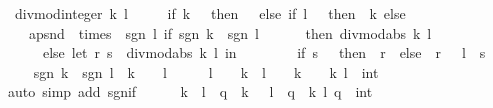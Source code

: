 \begin{isabellebody}
\ \ {\isachardoublequoteopen}divmod{\isacharunderscore}{\kern0pt}integer\ k\ l\ {\isacharequal}{\kern0pt}\isanewline
\ \ \ \ {\isacharparenleft}{\kern0pt}if\ k\ {\isacharequal}{\kern0pt}\ {}\ then\ {\isacharparenleft}{\kern0pt}{}{\isacharcomma}{\kern0pt}\ {}{\isacharparenright}{\kern0pt}\ else\ if\ l\ {\isacharequal}{\kern0pt}\ {}\ then\ {\isacharparenleft}{\kern0pt}{}{\isacharcomma}{\kern0pt}\ k{\isacharparenright}{\kern0pt}\ else\isanewline
\ \ \ \ {\isacharparenleft}{\kern0pt}apsnd\ {\isasymcirc}\ times\ {\isasymcirc}\ sgn{\isacharparenright}{\kern0pt}\ l\ {\isacharparenleft}{\kern0pt}if\ sgn\ k\ {\isacharequal}{\kern0pt}\ sgn\ l\isanewline
\ \ \ \ \ \ then\ divmod{\isacharunderscore}{\kern0pt}abs\ k\ l\isanewline
\ \ \ \ \ \ else\ {\isacharparenleft}{\kern0pt}let\ {\isacharparenleft}{\kern0pt}r{\isacharcomma}{\kern0pt}\ s{\isacharparenright}{\kern0pt}\ {\isacharequal}{\kern0pt}\ divmod{\isacharunderscore}{\kern0pt}abs\ k\ l\ in\isanewline
\ \ \ \ \ \ \ \ if\ s\ {\isacharequal}{\kern0pt}\ {}\ then\ {\isacharparenleft}{\kern0pt}{\isacharminus}{\kern0pt}\ r{\isacharcomma}{\kern0pt}\ {}{\isacharparenright}{\kern0pt}\ else\ {\isacharparenleft}{\kern0pt}{\isacharminus}{\kern0pt}\ r\ {\isacharminus}{\kern0pt}\ {}{\isacharcomma}{\kern0pt}\ {\isasymbar}l{\isasymbar}\ {\isacharminus}{\kern0pt}\ s{\isacharparenright}{\kern0pt}{\isacharparenright}{\kern0pt}{\isacharparenright}{\kern0pt}{\isacharparenright}{\kern0pt}{\isachardoublequoteclose}\isanewline
%
\isadelimproof
%
\endisadelimproof
%
\isatagproof
{}\isamarkupfalse%
\ {\isacharminus}{\kern0pt}\isanewline
\ \ \isamarkupfalse%
\ {\isacharasterisk}{\kern0pt}{\isacharcolon}{\kern0pt}\ {\isachardoublequoteopen}sgn\ k\ {\isacharequal}{\kern0pt}\ sgn\ l\ {\isasymlongleftrightarrow}\ k\ {\isacharequal}{\kern0pt}\ {}\ {\isasymand}\ l\ {\isacharequal}{\kern0pt}\ {}\ {\isasymor}\ {}\ {\isacharless}{\kern0pt}\ l\ {\isasymand}\ {}\ {\isacharless}{\kern0pt}\ k\ {\isasymor}\ l\ {\isacharless}{\kern0pt}\ {}\ {\isasymand}\ k\ {\isacharless}{\kern0pt}\ {}{\isachardoublequoteclose}\ \ k\ l\ {\isacharcolon}{\kern0pt}{\isacharcolon}{\kern0pt}\ int\isanewline
\ \ \ \ \isamarkupfalse%
\ {\isacharparenleft}{\kern0pt}auto\ simp\ add{\isacharcolon}{\kern0pt}\ sgn{\isacharunderscore}{\kern0pt}if{\isacharparenright}{\kern0pt}\isanewline
\ \ \isamarkupfalse%
\ {\isacharasterisk}{\kern0pt}{\isacharasterisk}{\kern0pt}{\isacharcolon}{\kern0pt}\ {\isachardoublequoteopen}{\isacharminus}{\kern0pt}\ k\ {\isacharequal}{\kern0pt}\ l\ {\isacharasterisk}{\kern0pt}\ q\ {\isasymlongleftrightarrow}\ k\ {\isacharequal}{\kern0pt}\ {\isacharminus}{\kern0pt}\ {\isacharparenleft}{\kern0pt}l\ {\isacharasterisk}{\kern0pt}\ q{\isacharparenright}{\kern0pt}{\isachardoublequoteclose}\ \ k\ l\ q\ {\isacharcolon}{\kern0pt}{\isacharcolon}{\kern0pt}\ int\isanewline

\end{isabellebody}
